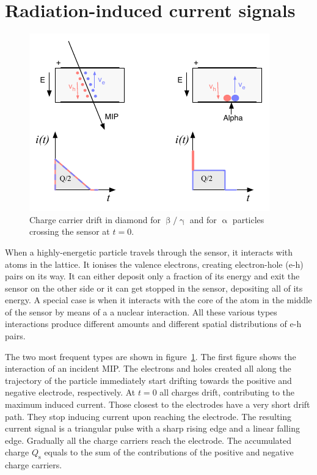 \section{Radiation-induced current signals}

\begin{figure}[!t]
\begin{center}
\includegraphics[width=0.8\linewidth]{02_pulse_formation/pics/plots/driftboth}
\caption{Charge carrier drift in diamond for $\upbeta/\upgamma$ and for $\upalpha$ particles crossing the sensor at $t=0$.}
\label{fig:drift}
\end{center}
\end{figure}

When a highly-energetic particle travels through the sensor, it interacts with atoms in the lattice. It ionises the valence electrons, creating electron-hole (e-h) pairs on its way. It can either deposit only a fraction of its energy and exit the sensor on the other side or it can get stopped in the sensor, depositing all of its energy. A special case is when it interacts with the core of the atom in the middle of the sensor by means of a a nuclear interaction. All these various types interactions produce different amounts and different spatial distributions of e-h pairs. 

The two most frequent types are shown in figure~\ref{fig:drift}. The first figure shows the interaction of an incident MIP. The electrons and holes created all along the trajectory of the particle immediately start drifting towards the positive and negative electrode, respectively. At $t=0$ all charges drift, contributing to the maximum induced current. Those closest to the electrodes have a very short drift path. They stop inducing current upon reaching the electrode. The resulting current signal is a triangular pulse with a sharp rising edge and a linear falling edge. Gradually all the charge carriers reach the electrode. The accumulated charge $Q_\mathrm{s}$ equals to the sum of the contributions of the positive and negative charge carriers. 

